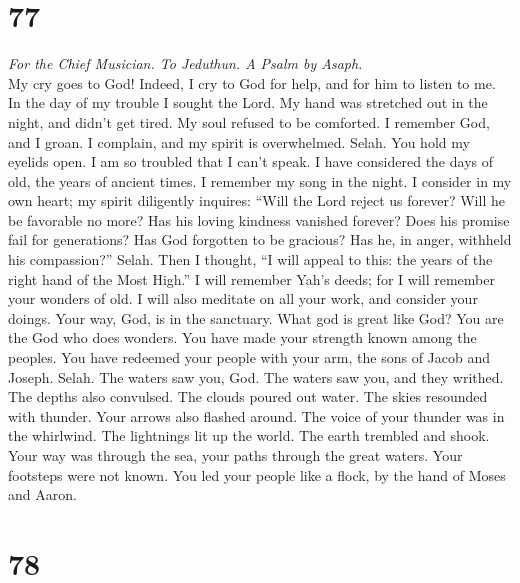\hypertarget{section-76}{%
\section{77}\label{section-76}}

\emph{For the Chief Musician. To Jeduthun. A Psalm by Asaph.}\\
 My cry goes to God! Indeed, I cry to God for help, and
for him to listen to me.  In the day of my trouble I
sought the Lord. My hand was stretched out in the night, and didn't get
tired. My soul refused to be comforted.  I remember God,
and I groan. I complain, and my spirit is overwhelmed. Selah.
 You hold my eyelids open. I am so troubled that I can't
speak.  I have considered the days of old, the years of
ancient times.  I remember my song in the night. I
consider in my own heart; my spirit diligently inquires: 
``Will the Lord reject us forever? Will he be favorable no more?
 Has his loving kindness vanished forever? Does his
promise fail for generations?  Has God forgotten to be
gracious? Has he, in anger, withheld his compassion?'' Selah.
 Then I thought, ``I will appeal to this: the years of
the right hand of the Most High.''  I will remember Yah's
deeds; for I will remember your wonders of old.  I will
also meditate on all your work, and consider your doings.
 Your way, God, is in the sanctuary. What god is great
like God?  You are the God who does wonders. You have
made your strength known among the peoples.  You have
redeemed your people with your arm, the sons of Jacob and Joseph. Selah.
 The waters saw you, God. The waters saw you, and they
writhed. The depths also convulsed.  The clouds poured
out water. The skies resounded with thunder. Your arrows also flashed
around.  The voice of your thunder was in the whirlwind.
The lightnings lit up the world. The earth trembled and shook.
 Your way was through the sea, your paths through the
great waters. Your footsteps were not known.  You led
your people like a flock, by the hand of Moses and Aaron.

\hypertarget{section-77}{%
\section{78}\label{section-77}}

